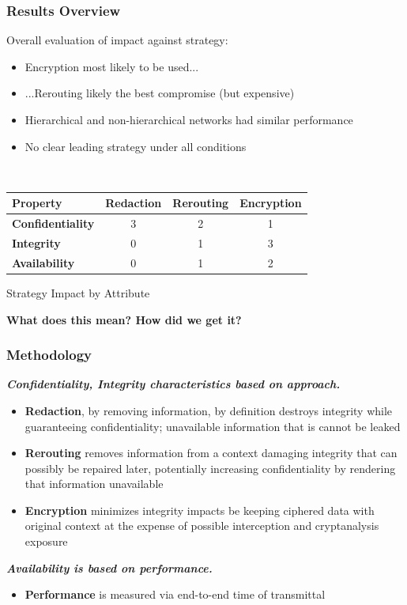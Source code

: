 \documentclass[t,handout]{beamer}
\begin{document}
\begin{frame}
\frametitle{Results Overview}
Overall evaluation of impact against strategy:
\begin{itemize}
\item {\small Encryption most likely to be used...}
\item {\small ...Rerouting likely the best compromise (but expensive)}
\item {\small Hierarchical and non-hierarchical networks had similar performance}
\item {\small No clear leading strategy under all conditions}
\end{itemize}
~\\
\centering %
\begin{tabular}{lccc}
\toprule %
{\bf Property}			& {\bf Redaction}	& {\bf Rerouting} 	& {\bf Encryption} 	\\\toprule
{\bf Confidentiality} 	& 3				  	& 2					& 1				 	\\\midrule
{\bf Integrity}			& 0					& 1					& 3 					\\\midrule
{\bf Availability}		& 0					& 1					& 2					\\\bottomrule
\end{tabular}
\label{table:model:evaluation}
\begin{center}
{\small Strategy Impact by Attribute}
\end{center}
\begin{center}
{\bf What does this mean? How did we get it?}
\end{center}
\end{frame}

\begin{frame}
\frametitle{Methodology}
{\bf \textit{Confidentiality, Integrity characteristics based on approach.}} \\
\begin{itemize}
\item {\small {\bf Redaction}, by removing information, by definition destroys integrity while guaranteeing confidentiality; unavailable information that is cannot be leaked}
\item {\small {\bf Rerouting} removes information from a context damaging integrity that can possibly be repaired later, potentially increasing confidentiality by rendering that information unavailable}
\item {\small {\bf Encryption} minimizes integrity impacts be keeping ciphered data with original context at the expense of possible interception and cryptanalysis exposure}
\end{itemize}
{\bf \textit{Availability is based on performance.}} \\
\begin{itemize}
\item {\small {\bf Performance} is measured via end-to-end time of transmittal}
\end{itemize}
\end{frame}
\end{document}

